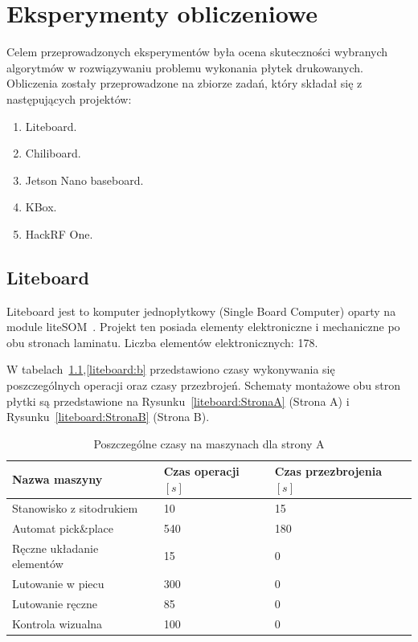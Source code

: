 \chapter{Eksperymenty obliczeniowe}

Celem przeprowadzonych eksperymentów była ocena skuteczności wybranych algorytmów w rozwiązywaniu problemu wykonania płytek drukowanych. Obliczenia zostały przeprowadzone na zbiorze zadań, który składał się z następujących projektów:
\begin{enumerate}
	\item Liteboard.
	\item Chiliboard.
	\item Jetson Nano baseboard.
	\item KBox.
	\item HackRF One.
\end{enumerate}

\section{Liteboard}

Liteboard jest to komputer jednopłytkowy (Single Board Computer) oparty na module liteSOM~\cite{liteboard}. Projekt ten posiada elementy elektroniczne i mechaniczne po obu stronach laminatu. Liczba elementów elektronicznych: 178.

\breakparagraph{}
W tabelach~\ref{liteboard:A},\ref{liteboard:b} przedstawiono czasy wykonywania się poszczególnych operacji oraz czasy przezbrojeń. Schematy montażowe obu stron płytki są przedstawione na Rysunku~\ref{liteboard:StronaA} (Strona A) i Rysunku~\ref{liteboard:StronaB} (Strona B).

\begin{table}[H]
	\centering
	\caption{Poszczególne czasy na maszynach dla strony A}
	\begin{tabular}{lll}
		\toprule
		Nazwa maszyny                 & Czas operacji $[s]$ & Czas przezbrojenia $[s]$ \\
		\midrule
		Stanowisko z sitodrukiem      & 10                  & 15                       \\
		Automat pick\&place           & 540                 & 180                      \\
		Ręczne układanie elementów & 15                  & 0                        \\
		Lutowanie w piecu             & 300                 & 0                        \\
		Lutowanie ręczne             & 85                  & 0                        \\
		Kontrola wizualna             & 100                 & 0                        \\
		\bottomrule
	\end{tabular}
	\label{liteboard:A}
\end{table}

